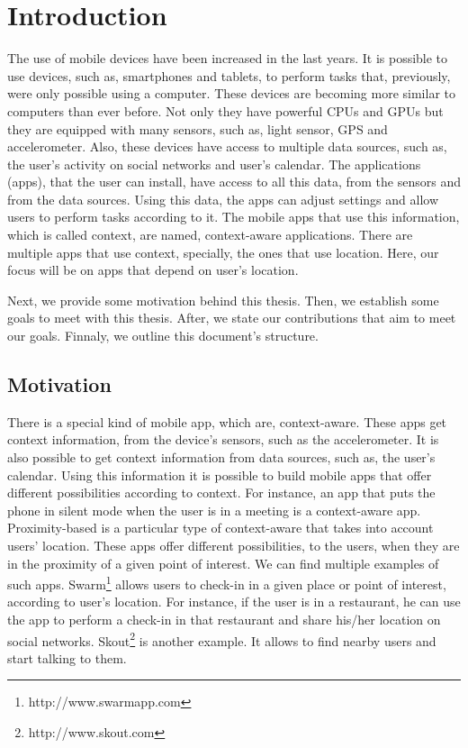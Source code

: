 
\chapter{Introduction}
\label{chapter:introduction}
The use of mobile devices have been increased in the last years.
It is possible to use devices, such as, smartphones and tablets, to perform tasks that, previously, were only possible using a computer.
These devices are becoming more similar to computers than ever before.
Not only they have powerful \glspl{CPU} and \glspl{GPU} but they are equipped with many sensors, such as, light sensor, \gls{GPS} and accelerometer.
Also, these devices have access to multiple data sources, such as,
the user's activity on social networks and user's calendar.
The applications (apps), that the user can install, have access to all this data, from the sensors and from the data sources.
Using this data, the apps can adjust settings and allow users to perform tasks according to it.
The mobile apps that use this information, which is called context, are named, context-aware applications.
There are multiple apps that use context, specially, the ones that use location.
Here, our focus will be on apps that depend on user's location.

Next, we provide some motivation behind this thesis.
Then, we establish some goals to meet with this thesis.
After, we state our contributions that aim to meet our goals.
Finnaly, we outline this document's structure.

\section{Motivation}
\label{sec:introduction_motivation}
There is a special kind of mobile app, which are, context-aware.
These apps get context information, from the device's sensors, such as the accelerometer.
It is also possible to get context information from data sources, such as, the user's calendar.
Using this information it is possible to build mobile apps that offer different possibilities according to context.
For instance, an app that puts the phone in silent mode when the user is in a meeting is a context-aware app.
Proximity-based is a particular type of context-aware that takes into account users' location.
These apps offer different possibilities, to the users, when they are in the proximity of a given point of interest.
We can find multiple examples of such apps.
Swarm\footnote{http://www.swarmapp.com} allows users to check-in in a given place or point of interest, according to user's location.
For instance, if the user is in a restaurant, he can use the app to perform a check-in in that restaurant and share his/her location on social networks.
Skout\footnote{http://www.skout.com}
is another example. It allows to find nearby users and start talking to them.

